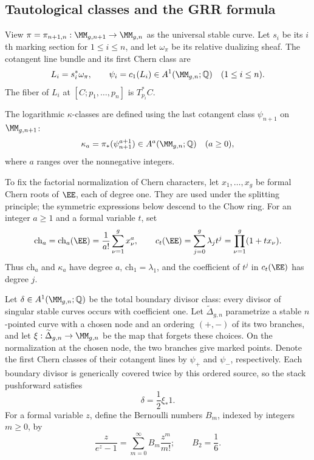 \subsection{Tautological classes and the GRR formula}
\label{subsec:s02:02}

View $\pi=\pi_{n+1,n}:\MM_{g,n+1}\to\MM_{g,n}$ as the universal
stable curve.  Let $s_i$ be its $i$th marking section for
$1\leq i\leq n$, and let $\omega_\pi$ be its relative dualizing
sheaf.  The cotangent line
bundle and its first Chern class are
\begin{equation}
\label{eq:s02:psi-definition}
L_i=s_i^*\omega_\pi,
\qquad
\psi_i=c_1(L_i)\in A^1(\MM_{g,n};\mathbb Q)
\quad(1\leq i\leq n).
\end{equation}
The fiber of $L_i$ at $[C;p_1,\ldots,p_n]$ is $T_{p_i}^*C$.

The logarithmic $\kappa$-classes are defined using the last cotangent
class $\psi_{n+1}$ on $\MM_{g,n+1}$:
\begin{equation}
\label{eq:s02:kappa-definition}
\kappa_a=\pi_*(\psi_{n+1}^{a+1})
\in A^a(\MM_{g,n};\mathbb Q)
\quad(a\geq0),
\end{equation}
where $a$ ranges over the nonnegative integers.

To fix the factorial normalization of Chern characters, let
$x_1,\ldots,x_g$ be formal Chern roots of $\EE$, each of degree one.
They are used under the splitting principle; the symmetric expressions
below descend to the Chow ring.  For an integer $a\geq1$ and a formal
variable $t$, set
\begin{equation}
\label{eq:s02:chern-definitions}
\mathrm{ch}_a=\mathrm{ch}_a(\EE)
=\frac{1}{a!}\sum_{\nu=1}^g x_\nu^a,
\qquad
c_t(\EE)=\sum_{j=0}^g\lambda_jt^j
=\prod_{\nu=1}^g(1+tx_\nu).
\end{equation}
Thus $\mathrm{ch}_a$ and $\kappa_a$ have degree $a$,
$\mathrm{ch}_1=\lambda_1$, and the coefficient of $t^j$ in
$c_t(\EE)$ has degree $j$.

Let $\delta\in A^1(\MM_{g,n};\mathbb Q)$ be the total boundary
divisor class: every divisor of singular stable curves occurs with
coefficient one.  Let $\widetilde\Delta_{g,n}$ parametrize a stable
$n$-pointed curve with a chosen node and an ordering $(+,-)$ of its two
branches, and let $\xi:\widetilde\Delta_{g,n}\to\MM_{g,n}$ be the
map that forgets these choices.  On the normalization at the chosen
node, the two branches give marked points.  Denote the first Chern
classes of their cotangent lines by $\psi_+$ and $\psi_-$,
respectively.  Each boundary divisor is generically covered twice by this ordered
source, so the stack pushforward satisfies
\begin{equation}
\label{eq:s02:ordered-boundary}
\delta=\frac12\xi_*1.
\end{equation}
For a formal variable $z$, define the Bernoulli numbers
$B_m$, indexed by integers $m\geq0$, by
\begin{equation}
\label{eq:s02:bernoulli-convention}
\frac{z}{e^z-1}=\sum_{m=0}^{\infty}B_m\frac{z^m}{m!};
\qquad B_2=\frac16.
\end{equation}

